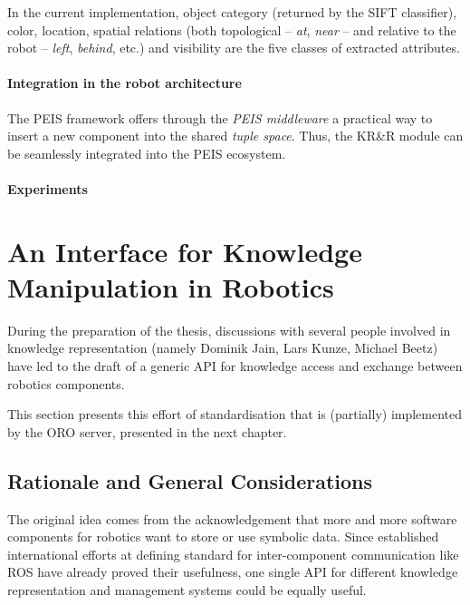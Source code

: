 In the current implementation, object category (returned by the SIFT
classifier), color, location, spatial relations (both topological -- \emph{at},
\emph{near} -- and relative to the robot -- \emph{left}, \emph{behind}, etc.)
and visibility are the five classes of extracted attributes.

\paragraph{Integration in the robot architecture}
\label{sect|peis-integration}

The PEIS framework offers through the \emph{PEIS middleware} a practical way to
insert a new component into the shared \emph{tuple space}.  Thus, the KR\&R
module can be seamlessly integrated into the PEIS ecosystem.

\paragraph{Experiments}
\label{sect|peis-expe}




\section{An Interface for Knowledge Manipulation in Robotics}
\label{sect|knowledge-api}

During the preparation of the thesis, discussions with several people involved
in knowledge representation (namely Dominik Jain, Lars Kunze, Michael Beetz)
have led to the draft of a generic API for knowledge access and exchange
between robotics components.

This section presents this effort of standardisation that is (partially)
implemented by the ORO server, presented in the next chapter.

\subsection{Rationale and General Considerations}

The original idea comes from the acknowledgement that more and more software
components for robotics want to store or use symbolic data. Since established
international efforts at defining standard for inter-component communication
like ROS have already proved their usefulness, one single API for different
knowledge representation and management systems could be equally useful.

